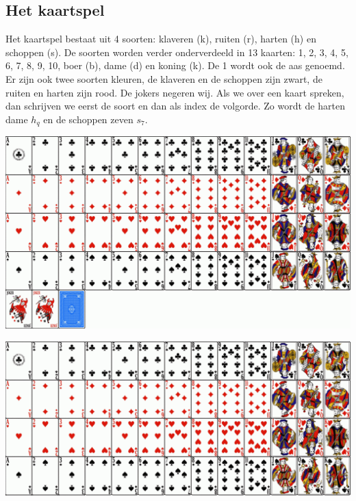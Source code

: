 \documentclass[12pt,twoside]{article}
\begin{document}
\subsection*{Het kaartspel}
Het kaartspel bestaat uit 4 soorten: klaveren (k), ruiten (r), harten (h) en schoppen (s). De soorten worden verder onderverdeeld in 13 kaarten: 1, 2, 3, 4, 5, 6, 7, 8, 9, 10, boer (b), dame (d) en koning (k). De 1 wordt ook de aas genoemd. Er zijn ook twee soorten kleuren, de klaveren en de schoppen zijn zwart, de ruiten en harten zijn rood. De jokers negeren wij. Als we over een kaart spreken, dan schrijven we eerst de soort en dan als index de volgorde. Zo wordt de harten dame $h_q$ en de schoppen zeven $s_7$.

\includegraphics[width=\textwidth, angle=0]{kaartspel}

\newpage
\thispagestyle{empty}
\includegraphics[width=1.4\textwidth, angle=90]{kaartspel_2}


\end{document}

